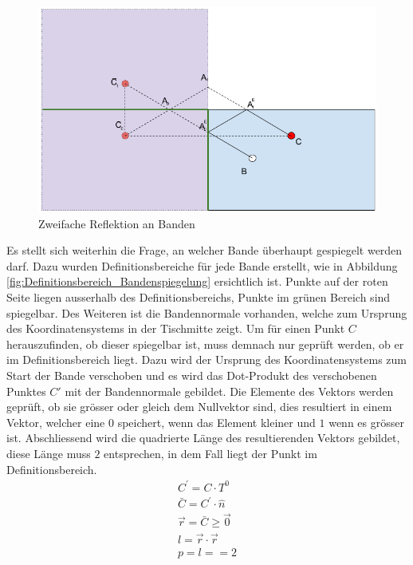 \begin{figure}[h!]
    \begin{center}
        \includegraphics[width=1\linewidth]{../common/03_billiard_ai/resources/50_rail_reflection_2.png}
    \end{center}
    \caption{Zweifache Reflektion an Banden}
    \label{fig:Zweifache Reflektion an Banden}
\end{figure}

Es stellt sich weiterhin die Frage, an welcher Bande überhaupt gespiegelt werden darf. Dazu wurden Definitionsbereiche
für jede Bande erstellt, wie in Abbildung \ref{fig:Definitionsbereich_Bandenspiegelung} ersichtlich ist. Punkte auf
der roten Seite liegen ausserhalb des Definitionsbereichs, Punkte im grünen Bereich sind spiegelbar. Des Weiteren
ist die Bandennormale vorhanden, welche zum Ursprung des Koordinatensystems in der Tischmitte zeigt. Um für einen Punkt
$C$ herauszufinden, ob dieser spiegelbar ist, muss demnach nur geprüft werden, ob er im Definitionsbereich liegt.
Dazu wird der Ursprung des Koordinatensystems zum Start der Bande verschoben und es wird das Dot-Produkt des verschobenen Punktes $C'$
mit der Bandennormale gebildet. Die Elemente des Vektors werden geprüft, ob sie grösser oder gleich dem Nullvektor sind,
dies resultiert in einem Vektor, welcher eine $0$ speichert, wenn das Element kleiner und $1$ wenn es grösser ist.
Abschliessend wird die quadrierte Länge des resultierenden Vektors gebildet, diese Länge muss $2$ entsprechen, in dem
Fall liegt der Punkt im Definitionsbereich.
\begin{align}
    C^{'} = C \cdot T^0\\
    \bar{C} = C^{'} \cdot \hat{n}\\
    \vec{r} = \bar{C} \geq \vec{0}\\
    l = \vec{r} \cdot \vec{r}\\
    p = l == 2
\end{align}

